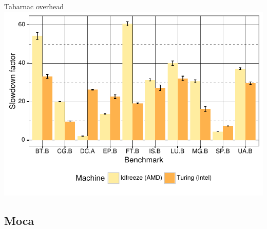 \documentclass[xcolor={usenames,dvipsnames},hyperref={pdfusetitle}]{beamer}
\begin{document}
\setcounter{framenumber}{\value{finalframe}}
\begin{frame}{Tabarnac overhead}
    \includegraphics[width=\linewidth]{tabarnac/tool-ovh.pdf}
\end{frame}

\subsection*{Moca}
\end{document}
